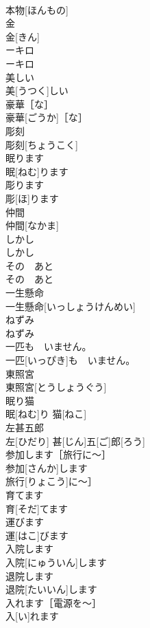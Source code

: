 \documentclass[8pt]{extreport}
\begin{document}
\begin{CJK}{UTF8}{min}
\\	本物[ほんもの]	
\\	金	
\\	金[きん]	
\\	ーキロ	
\\	ーキロ	
\\	美しい	
\\	美[うつく]しい	
\\	豪華［な］	
\\	豪華[ごうか]［な］	
\\	彫刻	
\\	彫刻[ちょうこく]	
\\	眠ります	
\\	眠[ねむ]ります	
\\	彫ります	
\\	彫[ほ]ります	
\\	仲間	
\\	仲間[なかま]	
\\	しかし	
\\	しかし	
\\	その　あと	
\\	その　あと	
\\	一生懸命	
\\	一生懸命[いっしょうけんめい]	
\\	ねずみ	
\\	ねずみ	
\\	一匹も　いません。	
\\	一匹[いっぴき]も　いません。	
\\	東照宮	
\\	東照宮[とうしょうぐう]	
\\	眠り猫	
\\	眠[ねむ]り 猫[ねこ]	
\\	左甚五郎	
\\	左[ひだり] 甚[じん]五[ご]郎[ろう]	
\\	参加します［旅行に〜］	
\\	参加[さんか]します
\\	旅行[りょこう]に〜］	
\\	育てます	
\\	育[そだ]てます	
\\	運びます	
\\	運[はこ]びます	
\\	入院します	
\\	入院[にゅういん]します	
\\	退院します	
\\	退院[たいいん]します	
\\	入れます［電源を〜］	
\\	入[い]れます

\end{CJK}
\end{document}
